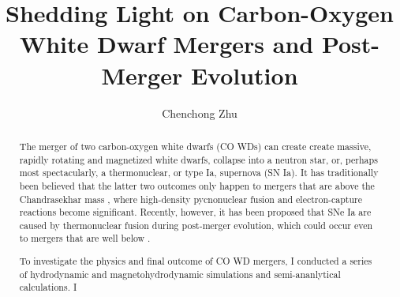 \documentclass{ut-thesis}
\author{Chenchong Zhu}
\title{Shedding Light on Carbon-Oxygen White Dwarf Mergers and Post-Merger Evolution}
\begin{document}
\begin{preliminary}

\maketitle


\begin{abstract}

The merger of two carbon-oxygen white dwarfs (CO WDs) can create create massive, rapidly rotating and magnetized white dwarfs, collapse into a neutron star, or, perhaps most spectacularly, a thermonuclear, or type Ia, supernova (SN Ia).  It has traditionally been believed that the latter two outcomes only happen to mergers that are above the Chandrasekhar mass \Mch, where high-density pycnonuclear fusion and electron-capture reactions become significant.  Recently, however, it has been proposed that SNe Ia are caused by thermonuclear fusion during post-merger evolution, which could occur even to mergers that are well below \Mch.  

To investigate the physics and final outcome of CO WD mergers, I conducted a series of hydrodynamic and magnetohydrodynamic simulations and semi-ananlytical calculations.  I



\end{abstract}
\end{preliminary}
\end{document}
